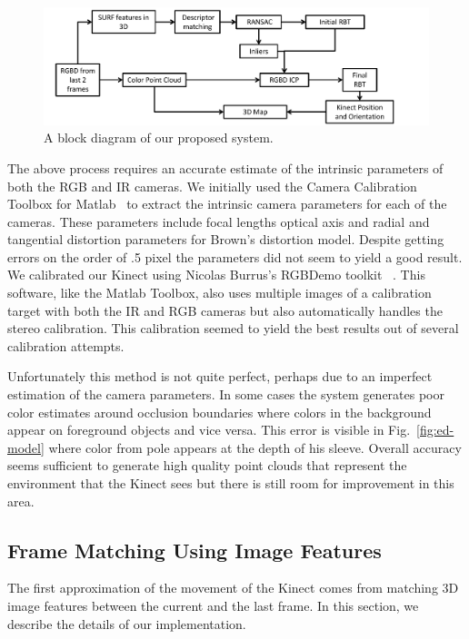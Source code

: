 \documentclass[letterpaper, 10pt, conference]{ieeeconf}
\begin{document}
\begin{figure}[t]
\centering
\includegraphics[width=1.0\textwidth]{figures/blockdiagram.pdf}
\caption{A block diagram of our proposed system.}
\label{fig:blockdiagram}
\end{figure}

The above process requires an accurate estimate of the intrinsic parameters of both the RGB and IR cameras.  We initially used the Camera Calibration Toolbox for Matlab~\cite{MatlabCalibration} to extract the intrinsic camera parameters for each of the cameras.  These parameters include focal lengths optical axis and radial and tangential distortion parameters for Brown's distortion model.  Despite getting errors on the order of .5 pixel the parameters did not seem to yield a good result.  We calibrated our Kinect using Nicolas Burrus's RGBDemo toolkit ~\cite{BurrusCalibration}.  This software, like the Matlab Toolbox, also uses multiple images of a calibration target with both the IR and RGB cameras but also automatically handles the stereo calibration.  This calibration seemed to yield the best results out of several calibration attempts.  

Unfortunately this method is not quite perfect, perhaps due to an imperfect estimation of the camera parameters.  In some cases the system generates poor color estimates around occlusion boundaries where colors in the background appear on foreground objects and vice versa.  This error is visible in Fig.~\ref{fig:ed-model} where color from pole appears at the depth of his sleeve.  Overall accuracy seems sufficient to generate high quality point clouds that represent the environment that the Kinect sees but there is still room for improvement in this area. 

\subsection{Frame Matching Using Image Features}
The first approximation of the movement of the Kinect comes from matching 3D image
features between the current and the last frame. In this section, we describe the details
of our implementation.
\end{document}
